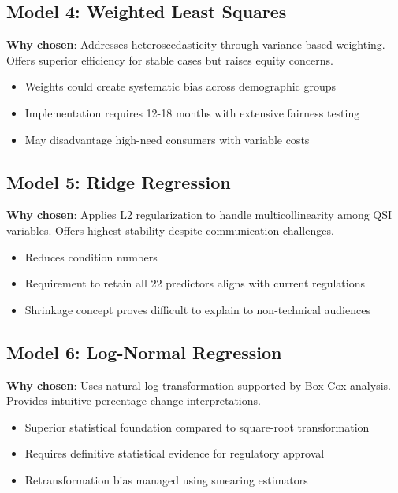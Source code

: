 \subsection{Model 4: Weighted Least Squares}
\textbf{Why chosen}: Addresses heteroscedasticity through variance-based weighting. Offers superior efficiency for stable cases but raises equity concerns.
\begin{itemize}
    \item Weights could create systematic bias across demographic groups
    \item Implementation requires 12-18 months with extensive fairness testing
    \item May disadvantage high-need consumers with variable costs
\end{itemize}

\subsection{Model 5: Ridge Regression}
\textbf{Why chosen}: Applies L2 regularization to handle multicollinearity among QSI variables. Offers highest stability despite communication challenges.
\begin{itemize}
    \item Reduces condition numbers
    \item Requirement to retain all 22 predictors aligns with current regulations
    \item Shrinkage concept proves difficult to explain to non-technical audiences
\end{itemize}

\subsection{Model 6: Log-Normal Regression}
\textbf{Why chosen}: Uses natural log transformation supported by Box-Cox analysis. Provides intuitive percentage-change interpretations.
\begin{itemize}
    \item Superior statistical foundation compared to square-root transformation
    \item Requires definitive statistical evidence for regulatory approval
    \item Retransformation bias managed using smearing estimators
\end{itemize}


